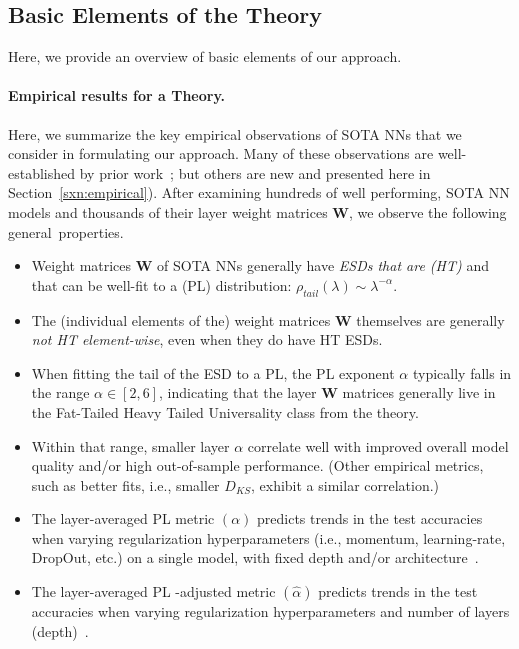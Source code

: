 \subsection{Basic Elements of the \SemiEmpirical Theory}
\label{sxn:matgen_basic_elements}

Here, we provide an overview of basic elements of our approach.

\paragraph{Empirical results for a \SemiEmpirical Theory.}

Here, we summarize the key empirical observations of SOTA NNs that we consider in formulating our approach.
Many of these observations are well-established by prior work~\cite{MM18_TR_JMLRversion,MM20a_trends_NatComm,MM21a_simpsons_TR,YTHx22_TR,YTHx23_KDD};
but others are new and presented here in Section~\ref{sxn:empirical}).
After examining hundreds of well performing, SOTA NN models and thousands of their layer weight matrices $\mathbf{W}$, we observe the following general~properties.
\begin{itemize}
\item 
  Weight matrices $\mathbf{W}$ of SOTA NNs generally have \emph{ESDs that are \HeavyTailed (HT)} and that
  can be well-fit to a \PowerLaw (PL) distribution:  $\rho_{tail}(\lambda)\sim\lambda^{-\alpha}$.
\item 
  The (individual elements of the) weight matrices $\mathbf{W}$ themselves are generally \emph{not HT element-wise}, even when they do have HT ESDs.
\item 
  When fitting the tail of the ESD to a PL, the PL exponent $\alpha$ typically falls in the range  $\alpha\in[2,6]$, indicating that the layer $\mathbf{W}$ matrices generally live in the Fat-Tailed Heavy Tailed Universality class from the \HTSR  theory.
\item 
  Within that range, smaller layer $\alpha$ correlate well with improved overall model quality and/or high out-of-sample performance.
 (Other empirical metrics, such as better fits, i.e., smaller $D_{KS}$, exhibit a similar correlation.) 
\item
 The layer-averaged PL \SHAPE metric \ALPHA $(\alpha)$ predicts trends in the test accuracies when varying regularization 
 hyperparameters (i.e., momentum, learning-rate, DropOut, etc.) on a single model, with fixed depth and/or architecture~\cite{MM18_TR_JMLRversion}.
\item 
 The layer-averaged PL \SCALE-adjusted \SHAPE metric \ALPHAHAT $(\hat{\alpha})$ predicts trends in the test accuracies 
 when varying regularization hyperparameters and number of layers (depth)~\cite{MM21a_simpsons_TR,MM20a_trends_NatComm}.
\end{itemize}

